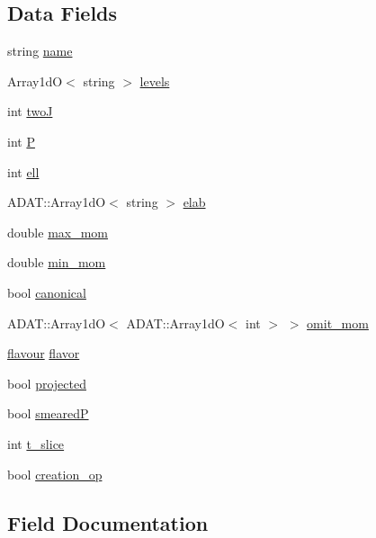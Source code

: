 \subsection*{Data Fields}
\begin{DoxyCompactItemize}
\item 
string \mbox{\hyperlink{structNPtCorr__t_adb6a5891cbfb63ad60b74a8ec3ad3c9d}{name}}
\item 
Array1dO$<$ string $>$ \mbox{\hyperlink{structNPtCorr__t_a0b5c4d899489f35ea5b0819ef6cb6999}{levels}}
\item 
int \mbox{\hyperlink{structNPtCorr__t_aa39375785267f2180d4131de79f6c5b4}{twoJ}}
\item 
int \mbox{\hyperlink{structNPtCorr__t_a530051d4aaec3209a8b249c67ab140ea}{P}}
\item 
int \mbox{\hyperlink{structNPtCorr__t_a9ae7e378310b94d8b64470b2293c6e51}{ell}}
\item 
A\+D\+A\+T\+::\+Array1dO$<$ string $>$ \mbox{\hyperlink{structNPtCorr__t_a30ae14bcaf1bfcfe59c218f221c4a7d3}{elab}}
\item 
double \mbox{\hyperlink{structNPtCorr__t_adb09bcee7c9b196ee4dd8deaea931d46}{max\+\_\+mom}}
\item 
double \mbox{\hyperlink{structNPtCorr__t_a1cfccfdd93bb408e8dd3f3baf3c81263}{min\+\_\+mom}}
\item 
bool \mbox{\hyperlink{structNPtCorr__t_a5e9e37e1d832213398398d73acd66f1f}{canonical}}
\item 
A\+D\+A\+T\+::\+Array1dO$<$ A\+D\+A\+T\+::\+Array1dO$<$ int $>$ $>$ \mbox{\hyperlink{structNPtCorr__t_ae0d8779e27a682de2026da1ebd5389e9}{omit\+\_\+mom}}
\item 
\mbox{\hyperlink{structflavour}{flavour}} \mbox{\hyperlink{structNPtCorr__t_a6a23561e1df335ad24fa0b8b1070e134}{flavor}}
\item 
bool \mbox{\hyperlink{structNPtCorr__t_a7b43815d3255674390104430367f8682}{projected}}
\item 
bool \mbox{\hyperlink{structNPtCorr__t_a82915520d12ede08a75c16a323fc5c30}{smearedP}}
\item 
int \mbox{\hyperlink{structNPtCorr__t_a30a953f2e6afa7c01c37b8eff4447524}{t\+\_\+slice}}
\item 
bool \mbox{\hyperlink{structNPtCorr__t_aa0a9ed7bdcc0871e8ae080d32c74208f}{creation\+\_\+op}}
\end{DoxyCompactItemize}


\subsection{Field Documentation}
\mbox{\label{structNPtCorr__t_a5e9e37e1d832213398398d73acd66f1f}} 
